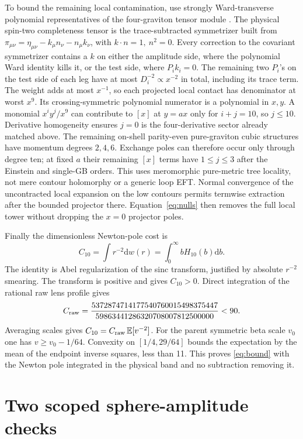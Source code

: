 \documentclass[11pt,a4paper]{article}
\theoremstyle{definition}
\theoremstyle{remark}
\newcommand{\dS}{\mathrm{d}}
\begin{document}
To bound the remaining local contamination, use strongly Ward-transverse polynomial representatives of the four-graviton tensor module \cite[Eq.~(8), App.~A.2]{CHLPS}. The physical spin-two completeness tensor is the trace-subtracted symmetrizer built from \(\pi_{\mu\nu}=\eta_{\mu\nu}-k_\mu n_\nu-n_\mu k_\nu\), with \(k\cdot n=1,\ n^2=0\). Every correction to the covariant symmetrizer contains a \(k\) on either the amplitude side, where the polynomial Ward identity kills it, or the test side, where \(P_i k_i=0\). The remaining two \(P_i\)'s on the test side of each leg have at most \(D_i^{-2}\propto x^{-2}\) in total, including its trace term. The weight adds at most \(x^{-1}\), so each projected local contact has denominator at worst \(x^9\). Its crossing-symmetric polynomial numerator is a polynomial in \(x,y\). A monomial $x^i y^j/x^9$ can contribute to $[x]$ at $y=ax$ only for $i+j=10$, so $j\le10$. Derivative homogeneity ensures $j=0$ is the four-derivative sector already matched above. The remaining on-shell parity-even pure-graviton cubic structures have momentum degrees $2,4,6$. Exchange poles can therefore occur only through degree ten; at fixed $a$ their remaining $[x]$ terms have $1\le j\le3$ after the Einstein and single-GB orders. This uses meromorphic pure-metric tree locality, not mere contour holomorphy or a generic loop EFT. Normal convergence of the uncontracted local expansion on the low contours permits termwise extraction after the bounded projector there. Equation~\eqref{eq:nulls} then removes the full local tower without dropping the $x=0$ projector poles.

Finally the dimensionless Newton-pole cost is
\begin{equation}\label{eq:cost}
 C_{10}=\int r^{-2}\dS w(r)=\int_0^\infty bH_{10}(b)\dS b .
\end{equation}
The identity is Abel regularization of the sinc transform, justified by absolute $r^{-2}$ smearing. The transform is positive and gives $C_{10}>0$. Direct integration of the rational raw lens profile gives
\[
 C_{\rm raw}=
 \frac{5372874714177540760015498375447}
      {59863441286320708007812500000}<90 .
\]
Averaging scales gives $C_{10}=C_{\rm raw}\,\mathbb E[v^{-2}]$. For the parent symmetric beta scale $v_0$ one has $v\ge v_0-1/64$. Convexity on $[1/4,29/64]$ bounds the expectation by the mean of the endpoint inverse squares, less than 11. This proves \eqref{eq:bound} with the Newton pole integrated in the physical band and no subtraction removing it.

\section{Two scoped sphere-amplitude checks}\label{sec:string}
\end{document}
